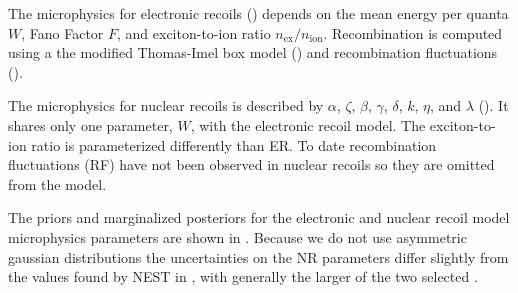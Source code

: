 The microphysics for electronic recoils () depends on the mean energy
per quanta $W$, Fano Factor $F$, and exciton-to-ion ratio $n_{\mathrm{ex}} / n_{\mathrm{ion}}$.  Recombination is computed using
a the modified Thomas-Imel box model () and recombination fluctuations
().

The microphysics for nuclear recoils is described by $\alpha$, $\zeta$, $\beta$, $\gamma$, $\delta$, $k$, $\eta$, and $\lambda$
().  It shares only one
parameter, $W$, with the electronic recoil model.  The exciton-to-ion ratio is parameterized differently than ER.  To date
recombination fluctuations (RF) have not been observed in nuclear recoils so they are omitted from the model.

The priors and marginalized posteriors for the electronic and nuclear recoil model microphysics parameters are shown in
.  Because we
do not use asymmetric gaussian distributions the uncertainties on the NR parameters differ slightly from the values
found by NEST in , with generally the larger of the two selected
.

